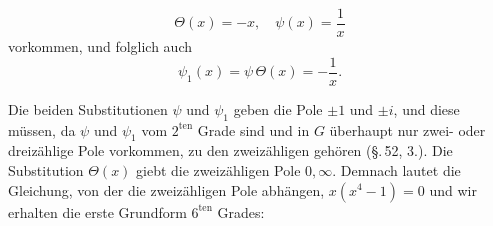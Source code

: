 \[
\Theta(x) = -x, \quad \psi(x) = \frac{1}{x}
\]
vorkommen, und folglich auch
\[
\psi_1(x) = \psi\,\Theta(x) = -\frac{1}{x}.
\]

Die beiden Substitutionen $\psi$ und $\psi_1$ geben die Pole $\pm 1$
und $\pm i$, und diese müssen, da $\psi$ und $\psi_1$ vom $2^{\text{ten}}$ Grade sind
und in $G$ überhaupt nur zwei- oder dreizählige Pole vorkommen,
zu den zweizähligen gehören (\S.\,52, 3.). Die Substitution $\Theta(x)$
giebt die zweizähligen Pole $0, \infty$. Demnach lautet die Gleichung,
von der die zweizähligen Pole abhängen, $x(x^4-1) = 0$ und wir
erhalten die erste Grundform $6^{\text{ten}}$ Grades:
